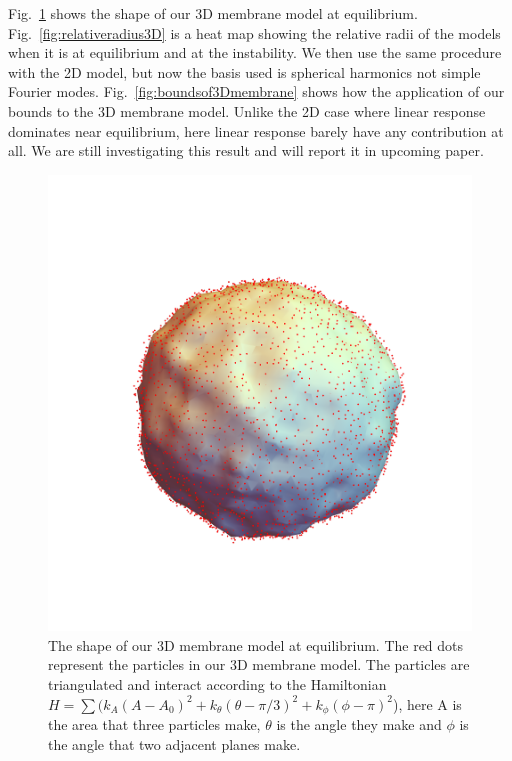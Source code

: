 \documentclass[amsmath,preprintnumbers,10pt,nofootinbib,prl,twocolumn]{revtex4-1}
\begin{document}
Fig.~\ref{fig:3Dmembranesurface} shows the shape of our 3D membrane model at equilibrium. Fig.~\ref{fig:relativeradius3D} is a heat map showing the relative radii of the models when it is at equilibrium and at the instability.
We then use the same procedure with the 2D model, but now the basis used is spherical harmonics not simple Fourier modes. Fig.~\ref{fig:boundsof3Dmembrane} shows how the application of our bounds to the 3D membrane model. Unlike the 2D case where linear response dominates near equilibrium, here linear response barely have any contribution at all. We are still investigating this result and will report it in upcoming paper.

\begin{figure}
\includegraphics[width=1\linewidth,angle=0]{Fig10.pdf}
\caption{ The shape of our 3D membrane model at equilibrium. The red dots represent the particles in our 3D membrane model. The particles are triangulated and interact according to the Hamiltonian $H=\sum (k_A(A-A_0)^2 + k_\theta (\theta-\pi/3)^2 + k_\phi (\phi-\pi)^2$), here A is the area that three particles make, $\theta$ is the angle they make and $\phi$ is the angle that two adjacent planes make.  }
\label{fig:3Dmembranesurface}
\end{figure}
\end{document}
